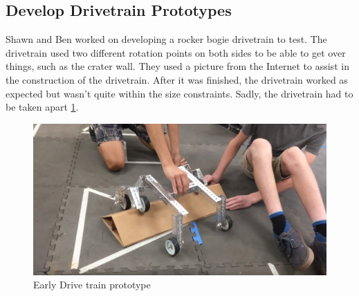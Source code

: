 \documentclass{article}
\begin{document}
\subsection{Develop Drivetrain Prototypes}
Shawn and Ben worked on developing a rocker bogie drivetrain to test. The drivetrain used two different rotation points on both sides to be able to get over things, such as the crater wall. They used a picture from the Internet to assist in the construction of the drivetrain. After it was finished, the drivetrain worked as expected but wasn't quite within the size constraints. Sadly, the drivetrain had to be taken apart \ref{fig:Drive-Train}. 

\begin{figure}
    \centering
    \includegraphics[width=.6\textwidth]{02_09-10/images/Screenshot.png}
    \caption{Early Drive train prototype}
    \label{fig:Drive-Train}
\end{figure}
\end{document}
